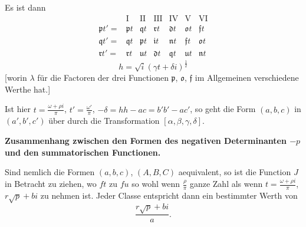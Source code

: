 \documentclass[12pt,a4paper]{article}
\begin{document}
Es ist dann
\[
\begin{array}{c|cccccc}
& \text{I} & \text{II} & \text{III} & \text{IV} & \text{V} & \text{VI} \\ \hline
\mathfrak{p}t' = & \mathfrak{p}t & \mathfrak{q}t & \mathfrak{r}t & \mathfrak{d}t & \mathfrak{o}t & \mathfrak{f}t \\
\mathfrak{q}t' = & \mathfrak{q}t & \mathfrak{p}t & \mathfrak{i}t & \mathfrak{n}t & \mathfrak{f}t & \mathfrak{o}t \\
\mathfrak{r}t' = & \mathfrak{r}t & \mathfrak{u}t & \mathfrak{d}t & \mathfrak{q}t & \mathfrak{u}t & \mathfrak{n}t
\end{array}
\]
\[
h = \sqrt{i}(\gamma t + \delta i)^{\frac{1}{2}}
\]
[worin $\lambda$ f\"ur die Factoren der drei Functionen $\mathfrak{p}$, $\mathfrak{o}$, $\mathfrak{f}$ im Allgemeinen verschiedene Werthe hat.]

Ist hier $t = \frac{\omega + \rho i}{\pi}$, $t' = \frac{\omega'}{\pi}$, $-\delta = hh - ac = b'b' - ac'$, so geht die Form $(a,b,c)$ in $(a',b',c')$ \"uber durch die Transformation $[\alpha,\beta,\gamma,\delta]$.

\textbf{Zusammenhang zwischen den Formen des negativen Determinanten $-p$ und den summatorischen Functionen.}

Sind nemlich die Formen $(a,b,c)$, $(A,B,C)$ aequivalent, so ist die Function $J$ in Betracht zu ziehen, wo $ft$ zu $fu$ so wohl wenn $\frac{\rho}{\pi}$ ganze Zahl als wenn $t = \frac{\omega + \rho i}{\pi}$, $r\sqrt{p} + bi$ zu nehmen ist. Jeder Classe entspricht dann ein bestimmter Werth von
\[
\frac{r\sqrt{p} + bi}{a}.
\]
\end{document}
